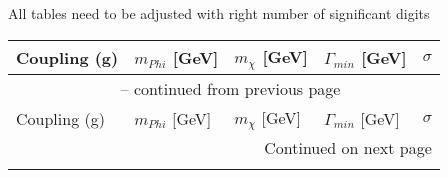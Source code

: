 All tables need to be adjusted with right number of significant digits

\begin{longtable}{lllll}
\toprule
Coupling (g) & $m_{Phi}$ [GeV] & $m_{\chi}$ [GeV] & $\Gamma_{min}$ [GeV] & $\sigma$\\
\midrule
\endfirsthead

\multicolumn{5}{c}{\tablename\ \thetable{} -- continued from previous page} \\
Coupling (g) & $m_{Phi}$ [GeV] & $m_{\chi}$ [GeV] & $\Gamma_{min}$ [GeV] & $\sigma$\\
\midrule
\endhead

\midrule
\multicolumn{5}{r}{{Continued on next page}} \\ 
\endfoot

\bottomrule
\endlastfoot


\end{longtable}
